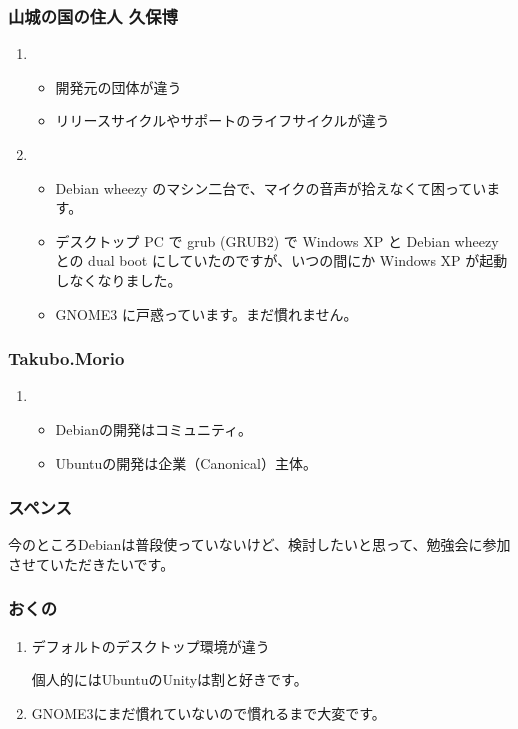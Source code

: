\documentclass[cjk,dvipdfmx,10pt,compress,%
hyperref={bookmarks=true,bookmarksnumbered=true,bookmarksopen=false,%
colorlinks=false,%
pdftitle={第 72 回 関西 Debian 勉強会},%
pdfauthor={倉敷・のがた・佐々木・かわだ・八津尾},%
pdfsubject={資料},%
}]{beamer}
\begin{document}
\begin{frame}\frametitle{ 山城の国の住人 久保博 }
  \begin{enumerate}
  \item
    \begin{itemize}
    \item 開発元の団体が違う
    \item リリースサイクルやサポートのライフサイクルが違う
    \end{itemize}
  \item 
    \begin{itemize}
    \item Debian wheezy のマシン二台で、マイクの音声が拾えなくて困っています。
    \item デスクトップ PC で grub (GRUB2) で Windows XP と Debian wheezy との dual boot にしていたのですが、いつの間にか Windows XP が起動しなくなりました。
    \item  GNOME3 に戸惑っています。まだ慣れません。
    \end{itemize}
  \end{enumerate}
\end{frame}

\begin{frame}\frametitle{ Takubo.Morio }
  \begin{enumerate}
  \item 
    \begin{itemize}
    \item Debianの開発はコミュニティ。
    \item Ubuntuの開発は企業（Canonical）主体。
    \end{itemize}
  \end{enumerate}
\end{frame}

\begin{frame}\frametitle{ スペンス }
  今のところDebianは普段使っていないけど、検討したいと思って、勉強会に参加させていただきたいです。
\end{frame}

\begin{frame}\frametitle{ おくの }
  \begin{enumerate}
  \item デフォルトのデスクトップ環境が違う

    個人的にはUbuntuのUnityは割と好きです。

  \item GNOME3にまだ慣れていないので慣れるまで大変です。
  \end{enumerate}
\end{frame}
\end{document}
